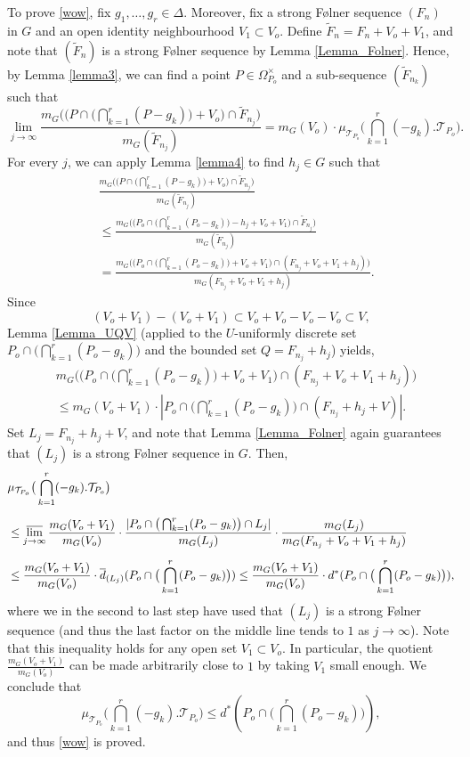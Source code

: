 \documentclass[12pt,reqno,a4paper]{amsart}
\numberwithin{equation}{section}
\newcommand{\cT}{\mathcal{T}}
\newcommand{\ra}{\rightarrow}
\theoremstyle{theorem}
\theoremstyle{task}
\theoremstyle{definition}
\begin{document}
To prove \eqref{wow}, fix $g_1,\ldots,g_r \in \Delta$. Moreover, fix a strong F\o lner sequence $(F_n)$
in $G$ and an open identity neighbourhood $V_1 \subset V_o$. Define $\widetilde{F}_n = F_n + V_o + V_1$, and note that $(\widetilde{F}_n)$ is a strong F\o lner sequence by Lemma \ref{Lemma_Folner}. Hence, by Lemma \ref{lemma3}, we can find a point $P \in \Omega_{P_o}^{\times}$ and a sub-sequence $(\widetilde{F}_{n_k})$ such that
\[
\lim_{j \ra \infty}
\frac{m_G\big(\big(P \cap \big(\bigcap_{k=1}^r (P-g_k)\big)+V_o\big) \cap \widetilde{F}_{n_j}\big)}{m_G(\widetilde{F}_{n_j})}
= m_G(V_o) \cdot \mu_{\cT_{P_o}}\big(\bigcap_{k=1}^r (-g_k).\cT_{P_o}\big).
\]
For every $j$, we can apply Lemma \ref{lemma4} to find $h_j \in G$ such that
\begin{align*}
&\frac{m_G\big(\big(P \cap \big(\bigcap_{k=1}^r (P-g_k)\big)+V_o\big) \cap \widetilde{F}_{n_j}\big)}{m_G(\widetilde{F}_{n_j})} \\[0.2cm]
&\leq \frac{m_G\big(\big(P_o \cap \big(\bigcap_{k=1}^r (P_o-g_k)\big) - h_j + V_o + V_1 \big) \cap \widetilde{F}_{n_j}\big)}{m_G(\widetilde{F}_{n_j})} \\[0.2cm]
&= 
\frac{m_G\big(\big(P_o \cap \big(\bigcap_{k=1}^r (P_o-g_k)\big)+V_o + V_1 \big) \cap (F_{n_j} + V_o + V_1 + h_j) \big)}{m_G(F_{n_j} + V_o + V_1 + h_j)}.
\end{align*}
Since 
\[
(V_o + V_1) - (V_o + V_1) \subset V_o + V_o - V_o - V_o \subset V,
\]
Lemma \ref{Lemma_UQV} (applied to the $U$-uniformly discrete set $P_o \cap \big(\bigcap_{k=1}^r (P_o-g_k)\big)$ and the bounded set $Q = F_{n_j} + h_j$) yields, 
\begin{align*}
&m_G\big(\big(P_o \cap \big(\bigcap_{k=1}^r (P_o-g_k)\big)+V_o + V_1 \big) \cap (F_{n_j} + V_o + V_1 + h_j) \big) \\[0.2cm]
&\leq m_G(V_o + V_1) \cdot |P_o \cap \big(\bigcap_{k=1}^r (P_o-g_k)\big) \cap (F_{n_j} + h_j + V)|.
\end{align*}
Set $L_j = F_{n_j} + h_j + V$, and note that Lemma \ref{Lemma_Folner} again guarantees that $(L_j)$ is a strong F\o lner sequence in $G$. Then,
\begin{align*}
&\mu_{\cT_{P_o}}\big(\bigcap_{k=1}^r (-g_k).\cT_{P_o}\big)
\\[0.2cm]
&\leq \varlimsup_{j \ra \infty} \frac{m_G(V_o + V_1)}{m_G(V_o)} \cdot \frac{|P_o \cap \big(\bigcap_{k=1}^r (P_o-g_k)\big) \cap L_j|}{m_G(L_j)} \cdot \frac{m_G(L_j)}{m_G(F_{n_j} + V_o + V_1 + h_j)} \\[0.2cm]
&\leq \frac{m_G(V_o + V_1)}{m_G(V_o)} \cdot \overline{d}_{(L_j)}(P_o \cap \big(\bigcap_{k=1}^r (P_o-g_k)\big)) \leq 
\frac{m_G(V_o + V_1)}{m_G(V_o)} \cdot d^*(P_o \cap \big(\bigcap_{k=1}^r (P_o-g_k)\big)),
\end{align*}
where we in the second to last step have used that $(L_j)$ is a strong F\o lner sequence (and thus the last factor on the middle line tends to $1$ as $j \ra \infty$).
Note that this inequality holds for any open set $V_1 \subset V_o$. In particular, the quotient $\frac{m_G(V_o + V_1)}{m_G(V_o)}$ can be made arbitrarily close to $1$ by taking $V_1$ small enough. We conclude that 
\[
\mu_{\cT_{P_o}}\big(\bigcap_{k=1}^r (-g_k).\cT_{P_o}\big) \leq  d^*(P_o \cap \big(\bigcap_{k=1}^r (P_o-g_k)\big)), 
\]
and thus \eqref{wow} is proved.
\end{document}

